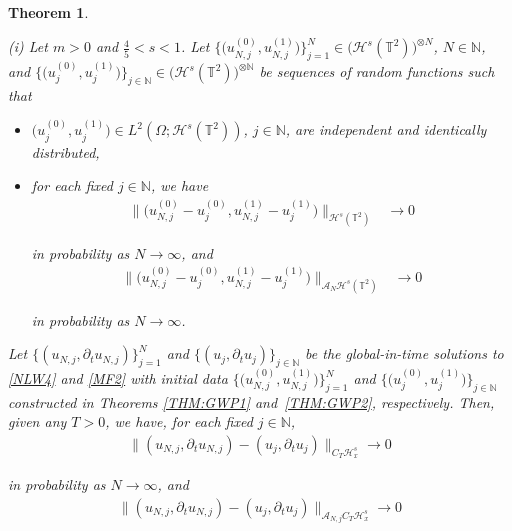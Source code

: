 \documentclass[letterpaper, 11pt,  reqno]{amsart}
\newtheorem{theorem}{Theorem}[section]
\newcommand{\1}{\hspace{0.5mm}\text{I}\hspace{0.2mm}}
\newcommand{\noi}{\noindent}
\newcommand{\T}{\mathbb{T}}
\newcommand{\N}{\mathbb{N}}
\renewcommand{\H}{\mathcal{H}}
\newcommand{\dt}{\partial_t}
\newcommand{\A}{\mathcal{A}}
\newcommand{\too}{\longrightarrow}
\renewcommand{\O}{\Omega}
\numberwithin{equation}{section}
\numberwithin{theorem}{section}
\begin{document}
\begin{theorem}
\label{THM:conv1}

\textup{(i)}
Let $m > 0$ and  $\frac 45 <  s < 1$.
Let 
$\big\{ \big(u_{N, j}^{(0)}, u_{N, j}^{(1)}\big)\big\}_{j = 1}^N
\in \big(\H^s (\T^2)\big)^{\otimes N}$, $N \in \N$, 
and 
$\big\{\big(u_{j}^{(0)}, u_{ j}^{(1)}\big)\big\}_{j \in \N}
\in \big(\H^s (\T^2)\big)^{\otimes \N}$
be 
 sequences of random functions
such that 

\smallskip

\begin{itemize}
\item
$\big(u_{j}^{(0)}, u_{ j}^{(1)}\big)
\in L^2(\O; \H^s (\T^2))$, $j \in \N$, 
 are independent and identically distributed, 


\smallskip

\item 
for each fixed $j \in \N$, we have 
\begin{align}
 \big\| \big( u_{N, j}^{(0)} - u_{j}^{(0)}, u_{N, j}^{(1)} -u_{j}^{(1)} \big) \big\|_{\H^s (\T^2)} 
& \too 0  
\label{IV1}
\end{align}


\noi
in probability as $N \to \infty$, and 
\begin{align}
 \big\| 
\big( u_{N, j}^{(0)} - u_{j}^{(0)}, u_{N, j}^{(1)} -u_{j}^{(1)} \big)
 \big\|_{\A_N \H^s (\T^2)} 
 & \longrightarrow 0
\label{IV2}
\end{align}

\noi
in probability as $N \to \infty$.


\end{itemize}

\smallskip


\noi
Let 
$\{ (u_{N, j}, \dt  u_{N, j})\}_{j = 1}^N$
and $\{(u_j, \dt u_j)\}_{j \in \N}$
be the global-in-time solutions to \eqref{NLW4} 
and \eqref{MF2}
with initial data $\big\{ \big(u_{N, j}^{(0)}, u_{N, j}^{(1)}\big)\big\}_{j = 1}^N$
and $\big\{\big(u_{j}^{(0)}, u_{ j}^{(1)}\big)\big\}_{j \in \N}$
constructed in Theorems \ref{THM:GWP1}
and~\ref{THM:GWP2}, respectively.
Then, given any $T > 0$,  we have, for each fixed $j \in \N$, 
\begin{align}
\| (u_{N, j}, \dt u_{N, j})   - (u_j, \dt u_j) \|_{ C_T  \H^s_x}
\too 0
\label{IV3}
\end{align}

\noi
in probability as $N \to \infty$, and 
\begin{align}
\| (u_{N, j}, \dt u_{N, j})   - (u_j, \dt u_j) \|_{\A_{N, j} C_T  \H^s_x}
\too 0
\label{IV4}
\end{align}


\end{theorem}
\end{document}
